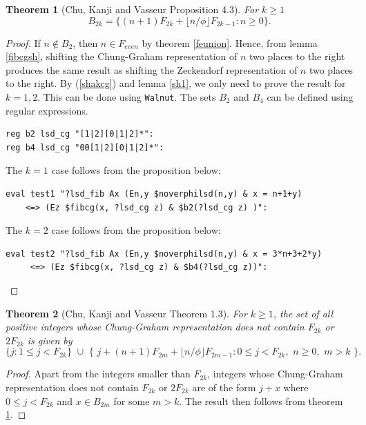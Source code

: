 \documentclass[12pt]{article}
\theoremstyle{plain}
\newtheorem{theorem}{Theorem}
\theoremstyle{case}
\theoremstyle{definition}
\begin{document}
\begin{theorem}[Chu, Kanji and Vasseur\cite{Chu:2025aa}  Proposition 4.3]
\label{ckv43}
For $k \geq 1$
 $$
 B_{2k} = \{ (n+1) F_{2k} + \lfloor n/\phi \rfloor F_{2k-1} : n \geq 0 \}.
$$
\end{theorem}
\begin{proof}
If $n \not \in B_{2}$, then $n \in F_{even}$ by theorem \ref{feunion}. Hence, from lemma \ref{fibcgsh}, shifting the Chung-Graham representation of $n$ two places to the right produces the same result as shifting the Zeckendorf representation of $n$ two places to the right. By (\ref{shakcg}) and lemma \ref{sh1}, we only need to prove the result for $k=1, 2$. This can be done using {\tt Walnut}. The sets $B_{2}$ and $B_{4}$ can be defined using regular expressions.
\begin{verbatim}
reg b2 lsd_cg "[1|2][0|1|2]*":
reg b4 lsd_cg "00[1|2][0|1|2]*":
\end{verbatim}
\bigskip
The $k=1$ case follows from the proposition below:
\begin{verbatim}
eval test1 "?lsd_fib Ax (En,y $noverphilsd(n,y) & x = n+1+y)  
    <=> (Ez $fibcg(x, ?lsd_cg z) & $b2(?lsd_cg z) )":
\end{verbatim}
The $k=2$ case follows from the proposition below:
\begin{verbatim}
eval test2 "?lsd_fib Ax (En,y $noverphilsd(n,y) & x = 3*n+3+2*y) 
     <=> (Ez $fibcg(x, ?lsd_cg z) & $b4(?lsd_cg z))":
\end{verbatim}
\end{proof}

\bigskip

\begin{theorem}[Chu, Kanji and Vasseur\cite{Chu:2025aa}  Theorem 1.3]
For $k \geq 1$, the set of all positive integers whose Chung-Graham representation does not contain $F_{2k}$ or $2 F_{2k}$ is given by
$$
\{ j : 1 \leq j < F_{2k} \} \,\, \cup \,\, \{ \,\, j + (n+1) F_{2m} + \lfloor n/\phi \rfloor F_{2m-1} : 0 \leq j < F_{2k} , \,\, n \geq 0, \,\, m > k \,\, \} .
$$
\end{theorem}
\begin{proof}
Apart from the integers smaller than $F_{2k}$, integers whose Chung-Graham representation does not contain $F_{2k}$ or $2 F_{2k}$ are of the form $j + x$ where $0 \leq j < F_{2k}$ and $x \in B_{2m}$ for some $m > k$. The result then follows from theorem \ref{ckv43}.
\end{proof}

\bigskip
\end{document}
